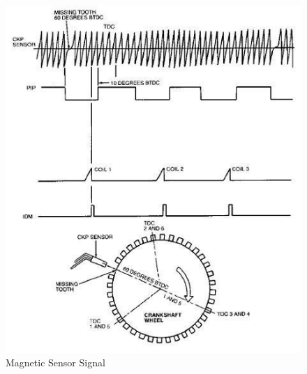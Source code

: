 	\begin{figure}[htbp]
		\centering
		\includegraphics[width=.8\textwidth]{figuras/fig-ckp-signal.png}
		\caption{Magnetic Sensor Signal \cite{cam-sensor-signal}}
		\label{fig:ckp-signal}
	\end{figure}